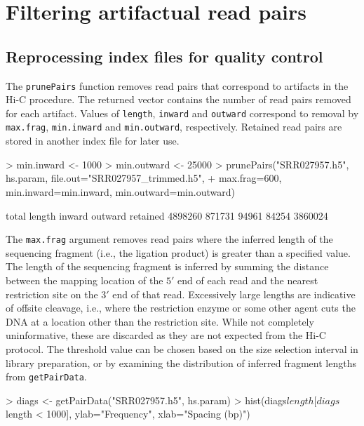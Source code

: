 \documentclass[12pt]{report}
\renewenvironment{Schunk}{\vspace{0pt}}{\vspace{0pt}}
\newcommand{\code}[1]{{\small\texttt{#1}}}
\begin{document}
\section{Filtering artifactual read pairs}

\subsection{Reprocessing index files for quality control}
The \code{prunePairs} function removes read pairs that correspond to artifacts in the Hi-C procedure.
The returned vector contains the number of read pairs removed for each artifact.
Values of \code{length}, \code{inward} and \code{outward} correspond to removal by \code{max.frag}, \code{min.inward} and \code{min.outward}, respectively.
Retained read pairs are stored in another index file for later use.

\begin{Schunk}
\begin{Sinput}
> min.inward <- 1000
> min.outward <- 25000
> prunePairs("SRR027957.h5", hs.param, file.out="SRR027957_trimmed.h5", 
+     max.frag=600, min.inward=min.inward, min.outward=min.outward)
\end{Sinput}
\begin{Soutput}
   total   length   inward  outward retained 
 4898260   871731    94961    84254  3860024 
\end{Soutput}
\end{Schunk}

The \code{max.frag} argument removes read pairs where the inferred length of the sequencing fragment (i.e., the ligation product) is greater than a specified value.
The length of the sequencing fragment is inferred by summing the distance between the mapping location of the $5'$ end of each read and the nearest restriction site on the $3'$ end of that read.
Excessively large lengths are indicative of offsite cleavage, i.e., where the restriction enzyme or some other agent cuts the DNA at a location other than the restriction site.
While not completely uninformative, these are discarded as they are not expected from the Hi-C protocol.
The threshold value can be chosen based on the size selection interval in library preparation, or by examining the distribution of inferred fragment lengths from \code{getPairData}.

\begin{Schunk}
\begin{Sinput}
> diags <- getPairData("SRR027957.h5", hs.param)
> hist(diags$length[diags$length < 1000], ylab="Frequency", xlab="Spacing (bp)")
\end{Sinput}
\end{Schunk}
\end{document}
